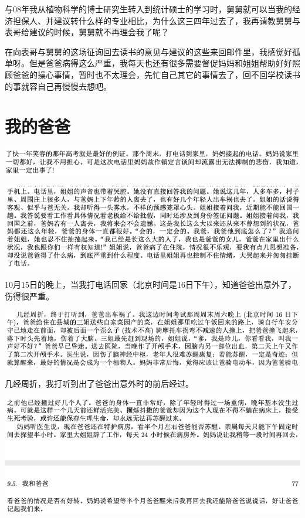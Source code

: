\documentclass[9pt, b5paper]{article}
\begin{document}
与08年我从植物科学的博士研究生转入到统计硕士的学习时，舅舅就可以当我的经济担保人、并建议转什么样的专业相比，为什么这三四年过去了，我再请教舅舅与表哥给建议的时候，舅舅就不再理会我了呢？

在向表哥与舅舅的这场征询回去读书的意见与建议的这些来回邮件里，我感觉好孤单呀。但是爸爸病得这么严重，我每天也还有很多需要督促妈妈和姐姐帮助好好照顾爸爸的操心事情，暂时也不太理会，先忙自己其它的事情去了，回不回学校读书的事就容自己再慢慢去想吧。

\section{我的爸爸}
\label{sec:org5e54e6b}

\begin{center}
\includegraphics[width=.9\linewidth]{./pic/backups_plans_20210416_155038.png}
\end{center}

\begin{center}
\includegraphics[width=.9\linewidth]{./pic/backups_plans_20210416_155131.png}
\end{center}

10月15日的晚上，当我打电话回家（北京时间是16日下午），知道爸爸出意外了，伤得很严重。

\begin{center}
\includegraphics[width=.9\linewidth]{./pic/backups_plans_20210414_193202.png}
\end{center}

几经周折，我打听到出了爸爸出意外时的前后经过。

\begin{center}
\includegraphics[width=.9\linewidth]{./pic/backups_plans_20210416_154642.png}
\end{center}
\end{document}
